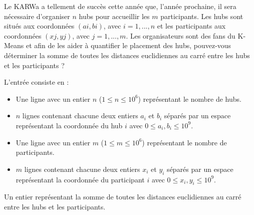 \problemname{\problemyamlname}


\newcommand{\maxa}{123456789}

Le KARWa a tellement de succès cette année que, l’année prochaine, il sera nécessaire d’organiser $n$ hubs pour
accueillir les $m$ participants. Les hubs sont situés aux coordonnées $(ai , bi )$, avec $i = 1, ..., n$ et les participants aux coordonnées $(xj , yj )$, avec $j = 1, ..., m$.
Les organisateurs sont des fans du K-Means et afin de les aider à quantifier le placement des hubs, pouvez-vous
déterminer la somme de toutes les distances euclidiennes au carré entre les hubs et les participants ?
\begin{Input}
    L'entrée consiste en :
    \begin{itemize}
        \item Une ligne avec un entier \(n\) (\(1 \leq n \leq 10^{6}\)) représentant le nombre de hubs.
      \item \(n\) lignes contenant chacune deux entiers \(a_{i}\) et \(b_{i}\) séparés par un espace représentant la coordonnée du hub \(i\) avec \(0 \leq a_i, b_i\leq 10^{9}\).
        \item Une ligne avec un entier \(m\) (\(1 \leq m \leq 10^{6}\))  représentant le nombre de participants.
      \item \(m\) lignes contenant chacune deux entiers \(x_{i}\) et \(y_{i}\) séparés par un espace représentant la coordonnée du participant \(i\) avec \(0 \leq x_i, y_i\leq 10^{9}\).
    \end{itemize}
\end{Input}

\begin{Output}
Un entier représentant la somme de toutes les distances euclidiennes au carré entre les hubs et les participants.
\end{Output}
